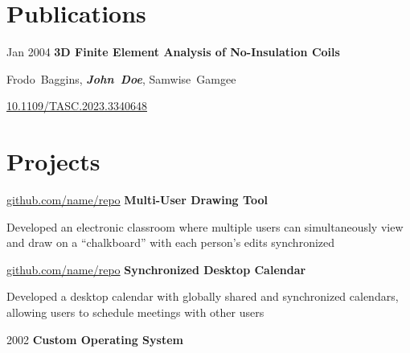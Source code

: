 \documentclass{maxcv}
\begin{document}
\section{Publications}
\begin{samepage}
    \begin{twocolentry}{
            Jan 2004
        }
        \textbf{3D Finite Element Analysis of No-Insulation Coils}
    \end{twocolentry}

    \vspace{0.10 cm}

    \begin{onecolentry}
        \mbox{Frodo Baggins}, \mbox{\textbf{\textit{John Doe}}}, \mbox{Samwise Gamgee}

        \vspace{0.10 cm}

        \href{https://doi.org/10.1109/TASC.2023.3340648}{10.1109/TASC.2023.3340648}
    \end{onecolentry}
\end{samepage}


\section{Projects}
\begin{twocolentry}{
        \href{https://github.com/sinaatalay/rendercv}{github.com/name/repo}
    }
    \textbf{Multi-User Drawing Tool}\end{twocolentry}

\vspace{0.10 cm}
\begin{onecolentry}
    \begin{highlights}
        \item Developed an electronic classroom where multiple users can simultaneously view and draw on a ``chalkboard'' with each person's edits synchronized\\
    \end{highlights}
\end{onecolentry}
\vspace{0.2 cm}
\begin{twocolentry}{
        \href{https://github.com/sinaatalay/rendercv}{github.com/name/repo}
    }
    \textbf{Synchronized Desktop Calendar}\end{twocolentry}

\vspace{0.10 cm}
\begin{onecolentry}
    \begin{highlights}
        \item Developed a desktop calendar with globally shared and synchronized calendars, allowing users to schedule meetings with other users\\
    \end{highlights}
\end{onecolentry}
\vspace{0.2 cm}
\begin{twocolentry}{
        2002
    }
    \textbf{Custom Operating System}\end{twocolentry}
\end{document}

